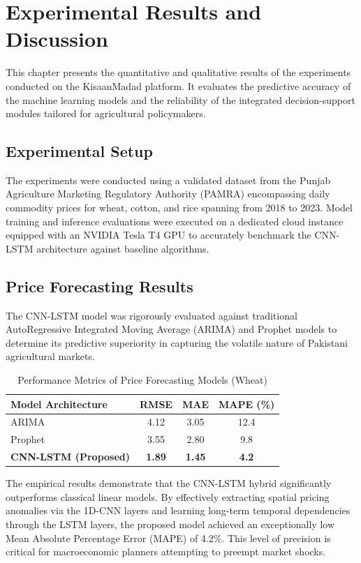 \chapter{Experimental Results and Discussion}

This chapter presents the quantitative and qualitative results of the experiments conducted on the KisaanMadad platform. It evaluates the predictive accuracy of the machine learning models and the reliability of the integrated decision-support modules tailored for agricultural policymakers.

\section{Experimental Setup}
The experiments were conducted using a validated dataset from the Punjab Agriculture Marketing Regulatory Authority (PAMRA) encompassing daily commodity prices for wheat, cotton, and rice spanning from 2018 to 2023. Model training and inference evaluations were executed on a dedicated cloud instance equipped with an NVIDIA Tesla T4 GPU to accurately benchmark the CNN-LSTM architecture against baseline algorithms.

\section{Price Forecasting Results}
The CNN-LSTM model was rigorously evaluated against traditional AutoRegressive Integrated Moving Average (ARIMA) and Prophet models to determine its predictive superiority in capturing the volatile nature of Pakistani agricultural markets.

\begin{table}[htbp]
  \centering
  \caption{Performance Metrics of Price Forecasting Models (Wheat)}
  \begin{tabular}{|l|c|c|c|}
    \hline
    \textbf{Model Architecture} & \textbf{RMSE} & \textbf{MAE} & \textbf{MAPE (\%)} \\
    \hline
    ARIMA & 4.12 & 3.05 & 12.4 \\
    Prophet & 3.55 & 2.80 & 9.8 \\
    \textbf{CNN-LSTM (Proposed)} & \textbf{1.89} & \textbf{1.45} & \textbf{4.2} \\
    \hline
  \end{tabular}
\end{table}

The empirical results demonstrate that the CNN-LSTM hybrid significantly outperforms classical linear models. By effectively extracting spatial pricing anomalies via the 1D-CNN layers and learning long-term temporal dependencies through the LSTM layers, the proposed model achieved an exceptionally low Mean Absolute Percentage Error (MAPE) of 4.2\%. This level of precision is critical for macroeconomic planners attempting to preempt market shocks.

